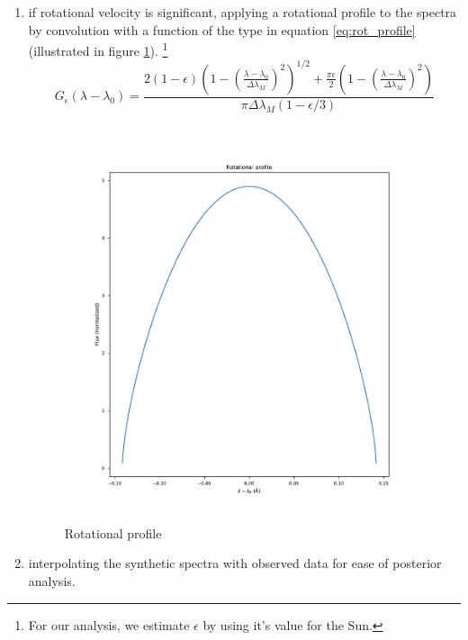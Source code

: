 \documentclass{aa}
\begin{document}
\begin{enumerate}
\item if rotational velocity is significant, applying a rotational profile to the
  spectra by convolution with a function of the type in equation \ref{eq:rot_profile}
  (illustrated in figure \ref{fig:rot_profile}). \footnote{For our analysis, we
    estimate $\epsilon$ by using it's value for the Sun.}
  \begin{equation}
    \label{eq:rot_profile}
    G_{\epsilon}\left(\lambda-\lambda_{0}\right)=\frac{2(1-\epsilon)\left(1-\left(\frac{\lambda-\lambda_{0}}{\Delta \lambda_{M}}\right)^{2}\right)^{1 / 2}+\frac{\pi \epsilon}{2}\left(1-\left(\frac{\lambda-\lambda_{0}}{\Delta \lambda_{M}}\right)^{2}\right)}{\pi \Delta \lambda_{M}(1-\epsilon / 3)}
  \end{equation}

  \begin{figure}[h]
    \centering
    \includegraphics[width=\linewidth]{rot_profile.pdf}
    \caption{Rotational profile}
    \label{fig:rot_profile}
  \end{figure}
  
\item interpolating the synthetic spectra with observed data
  for ease of posterior analysis. 
\end{enumerate}
\end{document}
